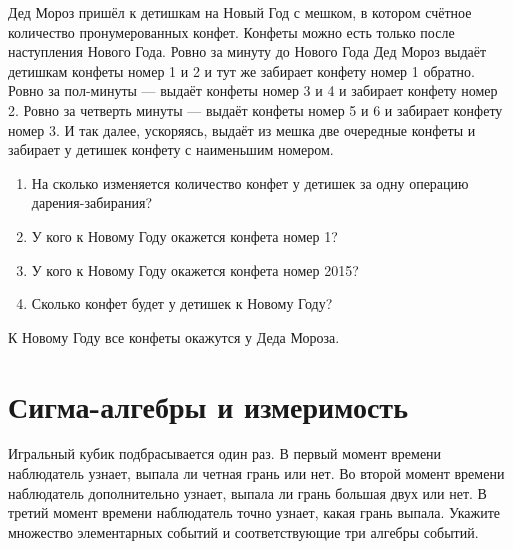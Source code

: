 \begin{problem}
Дед Мороз пришёл к детишкам на Новый Год с мешком, в котором счётное количество пронумерованных конфет. Конфеты можно есть только после наступления Нового Года. Ровно за минуту до Нового Года Дед Мороз выдаёт детишкам конфеты номер 1 и 2 и тут же забирает конфету номер 1 обратно. Ровно за пол-минуты — выдаёт конфеты номер 3 и 4 и забирает конфету номер 2. Ровно за четверть минуты — выдаёт конфеты номер 5 и 6 и забирает конфету номер 3. И так далее, ускоряясь, выдаёт из мешка две очередные конфеты и забирает у детишек конфету с наименьшим номером.

\begin{enumerate}
\item На сколько изменяется количество конфет у детишек за одну операцию дарения-забирания?
\item У кого к Новому Году окажется конфета номер 1?
\item У кого к Новому Году окажется конфета номер 2015?
\item Сколько конфет будет у детишек к Новому Году?
\end{enumerate}


\begin{sol}
К Новому Году все конфеты окажутся у Деда Мороза.
\end{sol}
\end{problem}



\section{Сигма-алгебры и измеримость}

\begin{problem}
Игральный кубик подбрасывается один раз. В первый момент времени
наблюдатель узнает, выпала ли четная грань или нет. Во второй
момент времени наблюдатель дополнительно узнает, выпала ли грань большая двух
или нет. В третий момент времени наблюдатель точно узнает, какая
грань выпала. Укажите множество элементарных событий и
соответствующие три алгебры событий.


\begin{sol}


\end{sol}
\end{problem}

